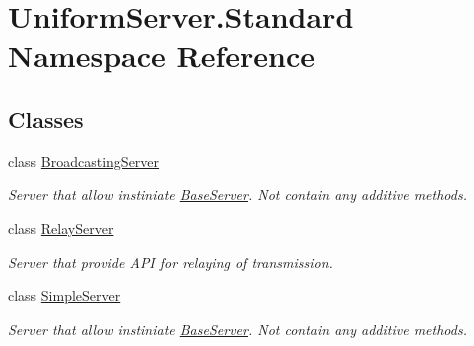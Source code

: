 \hypertarget{namespace_uniform_server_1_1_standard}{}\section{Uniform\+Server.\+Standard Namespace Reference}
\label{namespace_uniform_server_1_1_standard}
\subsection*{Classes}
\begin{DoxyCompactItemize}
\item 
class \mbox{\hyperlink{class_uniform_server_1_1_standard_1_1_broadcasting_server}{Broadcasting\+Server}}
\begin{DoxyCompactList}\small\item\em Server that allow instiniate \mbox{\hyperlink{class_uniform_server_1_1_base_server}{Base\+Server}}. Not contain any additive methods. \end{DoxyCompactList}\item 
class \mbox{\hyperlink{class_uniform_server_1_1_standard_1_1_relay_server}{Relay\+Server}}
\begin{DoxyCompactList}\small\item\em Server that provide A\+PI for relaying of transmission. \end{DoxyCompactList}\item 
class \mbox{\hyperlink{class_uniform_server_1_1_standard_1_1_simple_server}{Simple\+Server}}
\begin{DoxyCompactList}\small\item\em Server that allow instiniate \mbox{\hyperlink{class_uniform_server_1_1_base_server}{Base\+Server}}. Not contain any additive methods. \end{DoxyCompactList}\end{DoxyCompactItemize}
